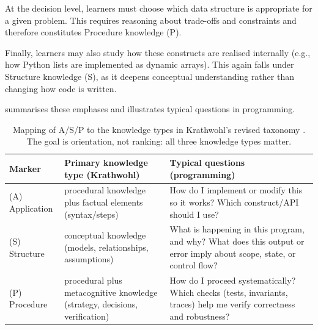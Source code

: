 \documentclass{article}
\begin{document}
At the decision level, learners must choose which data structure is appropriate for a given problem. This requires reasoning about trade-offs and constraints and therefore constitutes Procedure knowledge (P).\par

Finally, learners may also study how these constructs are realised internally (e.g., how Python lists are implemented as dynamic arrays). This again falls under Structure knowledge (S), as it deepens conceptual understanding rather than changing how code is written.\par

 summarises these emphases and illustrates typical questions in programming.\par


\begin{table}[hbt!]
  \centering
  \caption{Mapping of A/S/P to the knowledge types in Krathwohl's revised taxonomy \citep{Krathwohl2002}. The goal is orientation, not ranking: all three knowledge types matter.}
  \label{tab:asv-taxonomy}
  \begin{tabularx}{\linewidth}{@{}lXX@{}}
  \toprule
  \textbf{Marker} & \textbf{Primary knowledge type (Krathwohl)} & \textbf{Typical questions (programming)} \\
  \midrule
  (A) Application & procedural knowledge plus factual elements (syntax/steps) & How do I implement or modify this so it works? Which construct/API should I use? \\
  (S) Structure & conceptual knowledge (models, relationships, assumptions) & What is happening in this program, and why? What does this output or error imply about scope, state, or control flow? \\
  (P) Procedure & procedural plus metacognitive knowledge (strategy, decisions, verification) & How do I proceed systematically? Which checks (tests, invariants, traces) help me verify correctness and robustness? \\
  \bottomrule
  \end{tabularx}
  \end{table}
\end{document}

